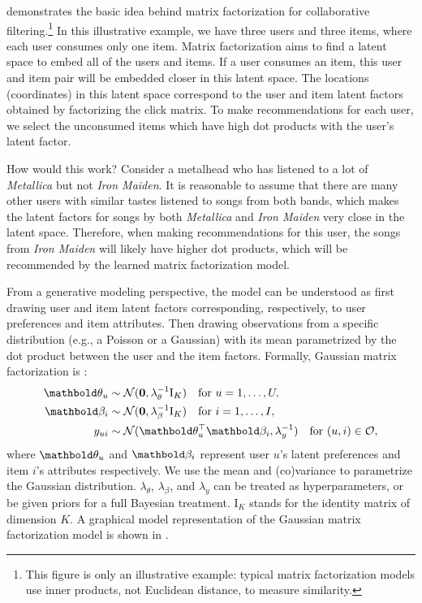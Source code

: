  demonstrates the basic idea behind matrix factorization for collaborative filtering.\footnote{This figure is only an illustrative example: typical matrix factorization models use inner products, not Euclidean distance, to measure similarity.} In this illustrative example, we have three users and three items, where each user consumes only one item. Matrix factorization aims to find a latent space to embed all of the users and items. If a user consumes an item, this user and item pair will be embedded closer in this latent space. The locations (coordinates) in this latent space correspond to the user and item latent factors obtained by factorizing the click matrix. To make recommendations for each user, we select the unconsumed items which have high dot products with the user's latent factor. 

How would this work? Consider a metalhead who has listened to a lot of \textit{Metallica} but not \textit{Iron Maiden}. It is reasonable to assume that there are many other users with similar tastes listened to songs from both bands, which makes the latent factors for songs by both \textit{Metallica} and \textit{Iron Maiden} very close in the latent space. Therefore, when making recommendations for this user, the songs from \textit{Iron Maiden} will likely have higher dot products, which will be recommended by the learned matrix factorization model.  

From a generative modeling perspective, the model can be understood as first drawing user and item latent factors corresponding,
respectively, to user preferences and item attributes. Then drawing 
observations from a specific distribution (e.g., a Poisson
or a Gaussian) with its mean parametrized by the dot product between the user and
the item factors. Formally, Gaussian matrix factorization is \citep{salakhutdinov2008probabilistic}: 
\begin{equation} 
\begin{split}
	\mb\theta_{u} &\sim \mathcal{N}(\bzero, \lambda_\theta^{-1} \mathrm{I}_K) \quad \textrm{for } u = 1, \dots, U, \\
	\mb\beta_{i} &\sim \mathcal{N}(\bzero, \lambda_\beta^{-1} \mathrm{I}_K) \quad \textrm{for } i = 1, \dots, I, \\
	y_{ui} &\sim \mathcal{N}(\mb\theta_u^\top \mb\beta_i, \lambda_y^{-1}) \quad \textrm{for } (u, i) \in \cO, 
 \end{split}
 \label{chpt:background:eq:gmf}
 \end{equation}
where $\mb\theta_u$ and $\mb\beta_i$ represent user $u$'s latent preferences and item $i$'s attributes respectively. We use the mean and (co)variance to
parametrize the Gaussian distribution. $\lambda_\theta$, $\lambda_\beta$, and
$\lambda_y$ can be treated as hyperparameters, or be given priors for a full Bayesian treatment. $\mathrm{I}_K$ stands for the identity
matrix of dimension $K$. A graphical model representation of the Gaussian matrix factorization model is shown in .

